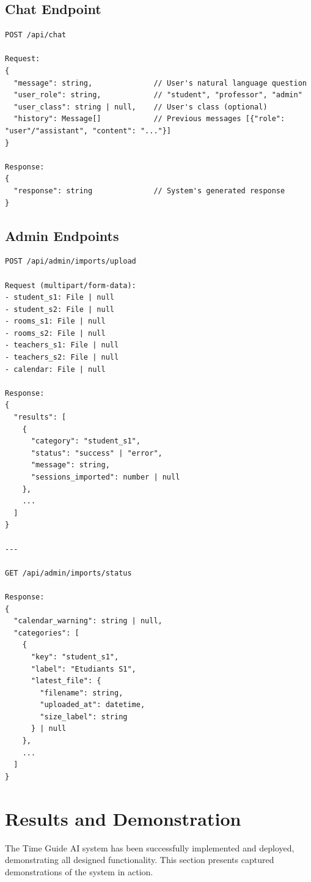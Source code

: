 \begin{fig}[H]
\subsection{Chat Endpoint}

\begin{verbatim}
POST /api/chat

Request:
{
  "message": string,              // User's natural language question
  "user_role": string,            // "student", "professor", "admin"
  "user_class": string | null,    // User's class (optional)
  "history": Message[]            // Previous messages [{"role": "user"/"assistant", "content": "..."}]
}

Response:
{
  "response": string              // System's generated response
}
\end{verbatim}

\subsection{Admin Endpoints}

\begin{verbatim}
POST /api/admin/imports/upload

Request (multipart/form-data):
- student_s1: File | null
- student_s2: File | null
- rooms_s1: File | null
- rooms_s2: File | null
- teachers_s1: File | null
- teachers_s2: File | null
- calendar: File | null

Response:
{
  "results": [
    {
      "category": "student_s1",
      "status": "success" | "error",
      "message": string,
      "sessions_imported": number | null
    },
    ...
  ]
}

---

GET /api/admin/imports/status

Response:
{
  "calendar_warning": string | null,
  "categories": [
    {
      "key": "student_s1",
      "label": "Etudiants S1",
      "latest_file": {
        "filename": string,
        "uploaded_at": datetime,
        "size_label": string
      } | null
    },
    ...
  ]
}
\end{verbatim}

\section{Results and Demonstration}

The Time Guide AI system has been successfully implemented and deployed, demonstrating all designed functionality. This section presents captured demonstrations of the system in action.


\end{fig}
